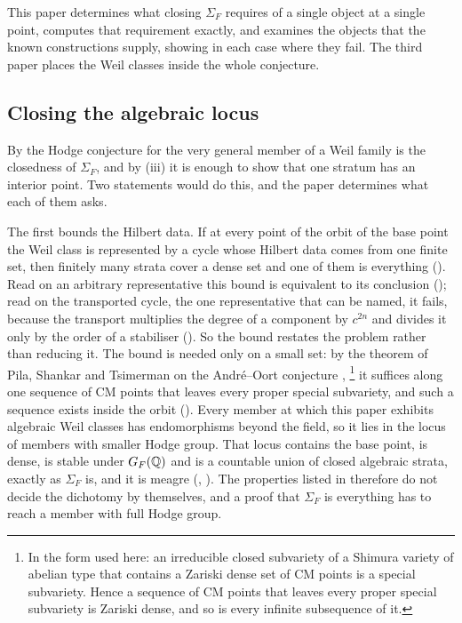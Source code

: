 This paper determines what closing $\Sigma_{F}$ requires of a single object
at a single point, computes that requirement exactly, and examines the
objects that the known constructions supply, showing in each case where they
fail. The third paper \cite{paperIII} places the Weil classes inside the
whole conjecture.

\subsection{Closing the algebraic locus}

By \cite[Theorem~1.1(iv)]{paperI} the Hodge conjecture for the very general member of a
Weil family is the closedness of $\Sigma_{F}$, and by (iii) it is enough to
show that one stratum has an interior point. Two statements would do this,
and the paper determines what each of them asks.

The first bounds the Hilbert data. If at every point of the orbit of the
base point the Weil class is represented by a cycle whose Hilbert data comes
from one finite set, then finitely many strata cover a dense set and one of
them is everything (\cite[Theorem~16.9]{paperI}). Read on an arbitrary
representative this bound is equivalent to its conclusion
(\cite[Theorem~16.17]{paperI}); read on the transported cycle, the one
representative that can be named, it fails, because the transport multiplies
the degree of a component by $c^{2n}$ and divides it only by the order of a
stabiliser (\cite[Theorem~16.15]{paperI}). So the bound restates the problem rather
than reducing it.
The bound is needed only on a small set: by the theorem of Pila, Shankar
and Tsimerman on the Andr\'e--Oort conjecture \cite{PST},%
\footnote{In the form used here: an irreducible closed subvariety of a
Shimura variety of abelian type that contains a Zariski dense set of CM
points is a special subvariety. Hence a sequence of CM points that leaves
every proper special subvariety is Zariski dense, and so is every infinite
subsequence of it.}
it suffices along
one sequence of CM points that leaves every proper special subvariety, and
such a sequence exists inside the orbit (\cite[Theorem~17.14]{paperI}). Every
member at which this paper exhibits algebraic Weil classes has endomorphisms
beyond the field, so it lies in the locus of members with smaller Hodge
group. That locus contains the base point, is dense, is stable under
$G_{F}(\mathbb{Q})$ and is a countable union of closed algebraic strata, exactly as
$\Sigma_{F}$ is, and it is meagre (\cite[Proposition~17.12]{paperI},
\cite[Corollary~17.13]{paperI}). The properties listed in \cite[Theorem~1.1]{paperI} therefore
do not decide the dichotomy by themselves, and a proof that $\Sigma_{F}$ is
everything has to reach a member with full Hodge group.

